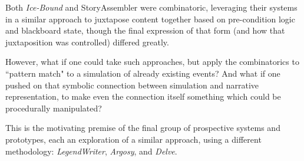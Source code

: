 Both \textit{Ice-Bound} and StoryAssembler were combinatoric, leveraging their systems in a similar approach to juxtapose content together based on pre-condition logic and blackboard state, though the final expression of that form (and how that juxtaposition was controlled) differed greatly.

However, what if one could take such approaches, but apply the combinatorics to ``pattern match" to a simulation of already existing events? And what if one pushed on that symbolic connection between simulation and narrative representation, to make even the connection itself  something which could be procedurally manipulated?

This is the motivating premise of the final group of prospective systems and prototypes, each an exploration of a similar approach, using a different methodology: \textit{LegendWriter}, \textit{Argosy}, and \textit{Delve}.
